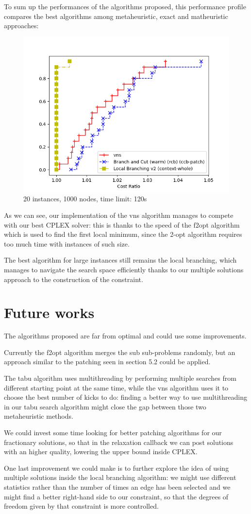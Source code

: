 To sum up the performances of the algorithms proposed, this performance profile compares the best algorithms among metaheuristic, exact and matheuristic approaches:

\begin{figure}[h]
    \centering
    \includegraphics*[width=.6\textwidth]{../plots/perfprof_conclusions.png}
    \caption*{20 instances, 1000 nodes, time limit: 120s}
\end{figure}

As we can see, our implementation of the vns algorithm manages to compete with our best CPLEX solver: this is thanks to the speed of the f2opt algorithm which is used to find the first local minimum, since the 2-opt algorithm requires too much time with instances of such size.

The best algorithm for large instances still remains the local branching, which manages to navigate the search space efficiently thanks to our multiple solutions approach to the construction of the constraint.

\section{Future works}
The algorithms proposed are far from optimal and could use some improvements.

Currently the f2opt algorithm merges the sub sub-problems randomly, but an approach similar to the patching seen in section 5.2 could be applied.

The tabu algorithm uses multithreading by performing multiple searches from different starting point at the same time, while the vns algorithm uses it to choose the best number of kicks to do: finding a better way to use multithreading in our tabu search algorithm might close the gap between those two metaheuristic methods.

We could invest some time looking for better patching algorithms for our fractionary solutions, so that in the relaxation callback we can post solutions with an higher quality, lowering the upper bound inside CPLEX.

One last improvement we could make is to further explore the idea of using multiple solutions inside the local branching algorithm: we might use different statistics rather than the number of times an edge has been selected and we might find a better right-hand side to our constraint, so that the degrees of freedom given by that constraint is more controlled.